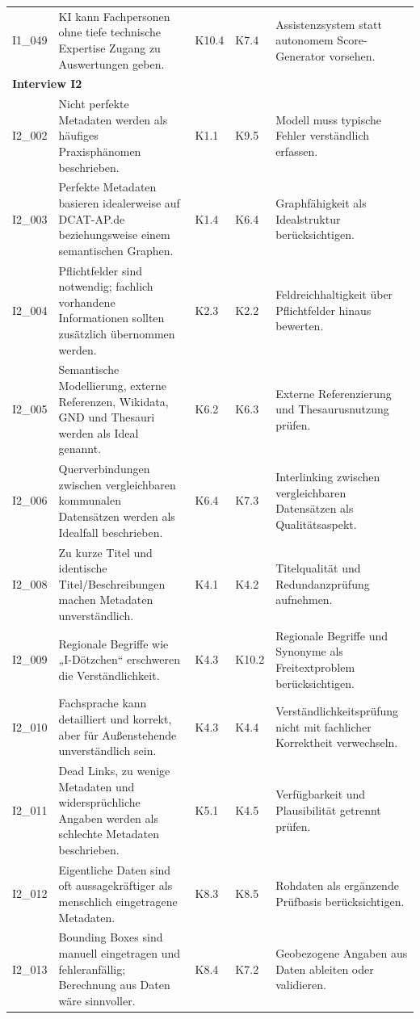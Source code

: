 \begin{longtable}{p{0.9cm} p{6cm} p{0.9cm} p{0.9cm} p{6cm}}
I1\_049 & KI kann Fachpersonen ohne tiefe technische Expertise Zugang zu Auswertungen geben. & K10.4 & K7.4 & Assistenzsystem statt autonomem Score-Generator vorsehen. \\
\multicolumn{5}{l}{\textbf{Interview I2}} \\
\midrule
I2\_002 & Nicht perfekte Metadaten werden als häufiges Praxisphänomen beschrieben. & K1.1 & K9.5 & Modell muss typische Fehler verständlich erfassen. \\
I2\_003 & Perfekte Metadaten basieren idealerweise auf DCAT-AP.de beziehungsweise einem semantischen Graphen. & K1.4 & K6.4 & Graphfähigkeit als Idealstruktur berücksichtigen. \\
I2\_004 & Pflichtfelder sind notwendig; fachlich vorhandene Informationen sollten zusätzlich übernommen werden. & K2.3 & K2.2 & Feldreichhaltigkeit über Pflichtfelder hinaus bewerten. \\
I2\_005 & Semantische Modellierung, externe Referenzen, Wikidata, GND und Thesauri werden als Ideal genannt. & K6.2 & K6.3 & Externe Referenzierung und Thesaurusnutzung prüfen. \\
I2\_006 & Querverbindungen zwischen vergleichbaren kommunalen Datensätzen werden als Idealfall beschrieben. & K6.4 & K7.3 & Interlinking zwischen vergleichbaren Datensätzen als Qualitätsaspekt. \\
I2\_008 & Zu kurze Titel und identische Titel/Beschreibungen machen Metadaten unverständlich. & K4.1 & K4.2 & Titelqualität und Redundanzprüfung aufnehmen. \\
I2\_009 & Regionale Begriffe wie „I-Dötzchen“ erschweren die Verständlichkeit. & K4.3 & K10.2 & Regionale Begriffe und Synonyme als Freitextproblem berücksichtigen. \\
I2\_010 & Fachsprache kann detailliert und korrekt, aber für Außenstehende unverständlich sein. & K4.3 & K4.4 & Verständlichkeitsprüfung nicht mit fachlicher Korrektheit verwechseln. \\
I2\_011 & Dead Links, zu wenige Metadaten und widersprüchliche Angaben werden als schlechte Metadaten beschrieben. & K5.1 & K4.5 & Verfügbarkeit und Plausibilität getrennt prüfen. \\
I2\_012 & Eigentliche Daten sind oft aussagekräftiger als menschlich eingetragene Metadaten. & K8.3 & K8.5 & Rohdaten als ergänzende Prüfbasis berücksichtigen. \\
I2\_013 & Bounding Boxes sind manuell eingetragen und fehleranfällig; Berechnung aus Daten wäre sinnvoller. & K8.4 & K7.2 & Geobezogene Angaben aus Daten ableiten oder validieren. \\

\end{longtable}
